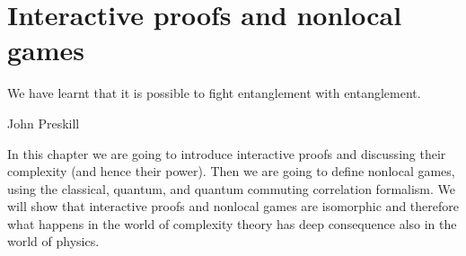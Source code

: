 \section{Interactive proofs and nonlocal games}
\epigraph{We have learnt that it is possible to fight entanglement with entanglement.}{John Preskill}

In this chapter we are going to introduce interactive proofs and discussing their complexity (and hence their power). Then we are going to define nonlocal games, using the classical, quantum, and quantum commuting correlation formalism. We will show that interactive proofs and nonlocal games are isomorphic and therefore what happens in the world of complexity theory has deep consequence also in the world of physics.

